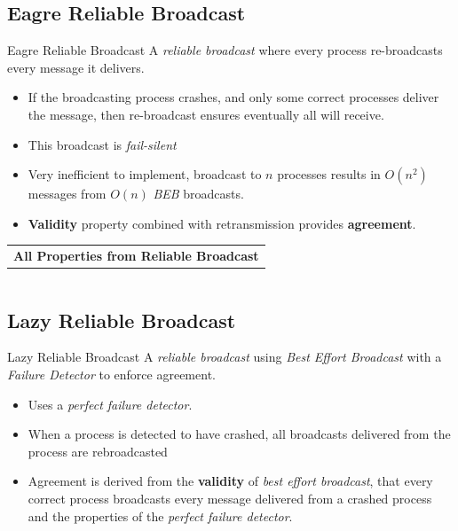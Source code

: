 \subsection{Eagre Reliable Broadcast}
\begin{definitionbox}{Eagre Reliable Broadcast}
    A \textit{reliable broadcast} where every process re-broadcasts every message it delivers.
    \begin{itemize}
        \item If the broadcasting process crashes, and only some correct processes deliver the message, then re-broadcast ensures eventually all will receive.
        \item This broadcast is \textit{fail-silent}
        \item Very inefficient to implement, broadcast to $n$ processes results in $O(n^2)$ messages from $O(n)$ \textit{BEB} broadcasts.
        \item \textbf{Validity} property combined with retransmission provides \textbf{agreement}.
    \end{itemize}
    \begin{center}
        \begin{tabular}{l l p{}}
            \multicolumn{3}{c}{\textbf{All Properties from Reliable Broadcast}} \\
        \end{tabular}
    \end{center}
\end{definitionbox}

\inputminted{elixir}{broadcast/code/eagre_reliable_broadcast.ex}

\subsection{Lazy Reliable Broadcast}
\begin{definitionbox}{Lazy Reliable Broadcast}
    A \textit{reliable broadcast} using \textit{Best Effort Broadcast} with a \textit{Failure Detector} to enforce agreement.
    \begin{itemize}
        \item Uses a \textit{perfect failure detector}.
        \item When a process is detected to have crashed, all broadcasts delivered from the process are rebroadcasted
        \item Agreement is derived from the \textbf{validity} of \textit{best effort broadcast}, that every correct process broadcasts every message delivered from a crashed process and the properties of the \textit{perfect failure detector}.
    \end{itemize}
\end{definitionbox}

